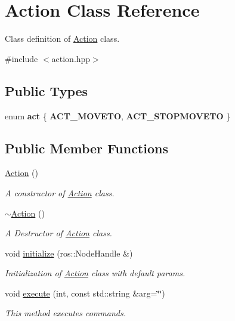 \hypertarget{class_action}{}\section{Action Class Reference}
\label{class_action}


Class definition of \hyperlink{class_action}{Action} class.  




{\ttfamily \#include $<$action.\+hpp$>$}

\subsection*{Public Types}
\begin{DoxyCompactItemize}
\item 
enum {\bfseries act} \{ {\bfseries A\+C\+T\+\_\+\+M\+O\+V\+E\+TO}, 
{\bfseries A\+C\+T\+\_\+\+S\+T\+O\+P\+M\+O\+V\+E\+TO}
 \}\hypertarget{class_action_ab5ece0fcaae0e78adfa0f7b36893401e}{}\label{class_action_ab5ece0fcaae0e78adfa0f7b36893401e}

\end{DoxyCompactItemize}
\subsection*{Public Member Functions}
\begin{DoxyCompactItemize}
\item 
\hyperlink{class_action_a4f457ccfc8336b565cadca56b36e0271}{Action} ()
\begin{DoxyCompactList}\small\item\em A constructor of \hyperlink{class_action}{Action} class. \end{DoxyCompactList}\item 
\hyperlink{class_action_acdb06775d157339256a8ecd55749226c}{$\sim$\+Action} ()
\begin{DoxyCompactList}\small\item\em A Destructor of \hyperlink{class_action}{Action} class. \end{DoxyCompactList}\item 
void \hyperlink{class_action_a43b331fb5dcad4544e9983cef0eb1532}{initialize} (ros\+::\+Node\+Handle \&)
\begin{DoxyCompactList}\small\item\em Initialization of \hyperlink{class_action}{Action} class with default params. \end{DoxyCompactList}\item 
void \hyperlink{class_action_ab468ccb2b7fe0ab033bd51b17ebf2012}{execute} (int, const std\+::string \&arg=\char`\"{}\char`\"{})
\begin{DoxyCompactList}\small\item\em This method executes commands. \end{DoxyCompactList}\end{DoxyCompactItemize}


